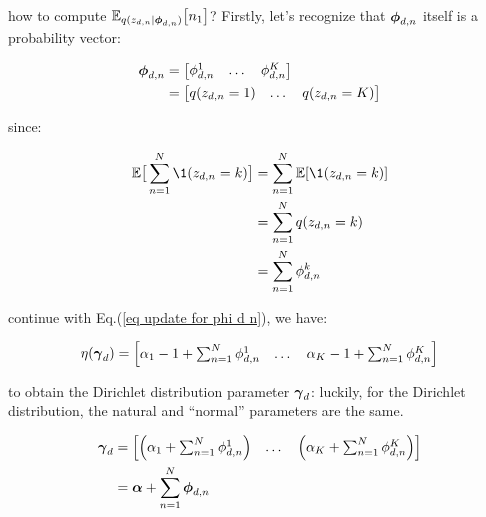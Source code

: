 \documentclass{article}
\begin{document}
how to compute $\mathbb{E}_{q(z_{d,n} | \boldsymbol{\phi}_{d,n} )}  \big[n_1\big]$? Firstly, let's recognize that $\boldsymbol{\phi}_{d,n}$ itself is a probability vector:

\begin{equation}\begin{split}\label{eq update for phi d n}
\boldsymbol{\phi}_{d,n} &=
\begin{bmatrix}
\phi_{d,n}^1 & \dots & \phi_{d,n}^K
\end{bmatrix}\\
&=\begin{bmatrix}
q(z_{d,n} = 1) & \dots & q(z_{d,n} = K)
\end{bmatrix}\\
\end{split}\end{equation}

since:

\begin{equation}\begin{split}
\E\big[\sum_{n=1}^N \1(z_{d,n} =  k) \big]&= \sum_{n=1}^N \E[ \1(z_{d,n} =  k) ]\\
&= \sum_{n=1}^N  q( z_{d,n} =  k)\\
&=  \sum_{n=1}^N  \phi_{d,n}^k
\end{split}\end{equation}

continue with Eq.(\ref{eq update for phi d n}), we have:

\begin{equation}\begin{split}
\eta(\boldsymbol{\gamma}_d) &= \begin{bmatrix}\alpha_1 - 1 + \sum_{n=1}^N  \phi_{d,n}^1  & \dots &  \alpha_K - 1 + \sum_{n=1}^N  \phi_{d,n}^K \end{bmatrix} \\
\end{split}\end{equation}


to obtain the Dirichlet distribution parameter $\boldsymbol{\gamma}_d$: luckily, for the Dirichlet distribution, the natural and ``normal'' parameters are the same.


\begin{equation}\begin{split}
\boldsymbol{\gamma}_{d}
&= \begin{bmatrix} \left(\alpha_1 +  \sum_{n=1}^N \phi^1_{d,n} \right) & \dots & \left(\alpha_K + \sum_{n=1}^N  \phi^K_{d,n}  \right) \end{bmatrix} \\
&= \boldsymbol{\alpha} +  \sum_{n=1}^N \boldsymbol{\phi}_{d,n}\\
\end{split}\end{equation}
\end{document}
